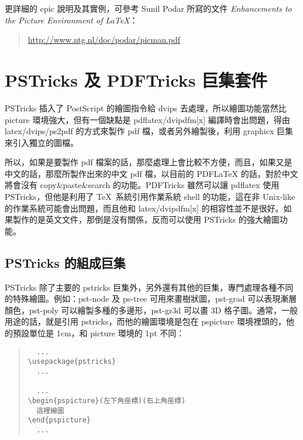 更詳細的 {\sffamily epic} 說明及其實例，可參考 Sunil Podar 所寫的文件 \textit{Enhancements to the Picture Environment of \LaTeX}：

\begin{quote}
  \url{http://www.ntg.nl/doc/podar/picman.pdf}
\end{quote}


\section{PSTricks 及 PDFTricks 巨集套件}
\label{sec:pstricks}

{\sffamily PSTricks} 插入了 {\sc PostScript} 的繪圖指令給 {\ttfamily dvips} 去處理，所以繪圖功能當然比 {\ttfamily picture} 環境強大，但有一個缺點是 {\ttfamily pdflatex/dvipdfm[x]} 編譯時會出問題，得由 {\ttfamily latex/dvips/ps2pdf} 的方式來製作 pdf 檔，或者另外繪製後，利用 {\sffamily graphicx} 巨集來引入獨立的圖檔。

所以，如果是要製作 pdf 檔案的話，那麼處理上會比較不方便，而且，如果又是中文的話，那麼所製作出來的中文 pdf 檔，以目前的 {\sffamily PDF\LaTeX} 的話，對於中文將會沒有 copy\&paste\&search 的功能。{\sffamily PDFTricks} 雖然可以讓 {\ttfamily pdflatex} 使用 {\sffamily PSTricks}，但他是利用了 \TeX\ 系統引用作業系統 shell 的功能，這在非 Unix-like 的作業系統可能會出問題，而且他和 {\ttfamily latex/dvipdfm[x]} 的相容性並不是很好。如果製作的是英文文件，那倒是沒有關係，反而可以使用 {\sffamily PSTricks} 的強大繪圖功能。

\subsection{PSTricks 的組成巨集}

{\sffamily PSTricks} 除了主要的 {\sffamily pstricks} 巨集外，另外還有其他的巨集，專門處理各種不同的特殊繪圖。例如：{\sffamily pst-node} 及 {\sffamily ps-tree} 可用來畫樹狀圖，{\sffamily pst-grad} 可以表現漸層顏色，{\sffamily pst-poly} 可以繪製多種的多邊形，{\sffamily pst-gr3d} 可以畫 3D 格子圖。通常，一般用途的話，就是引用 {\sffamily pstricks}，而他的繪圖環境是包在 {\ttfamily pspicture} 環境裡頭的，他的預設單位是 1cm，和 {\ttfamily picture} 環境的 1pt 不同：

\begin{quote}
  \begin{verbatim}
  ...
\usepackage{pstricks}
  ...

  ...
\begin{pspicture}(左下角座標)(右上角座標)
  這裡繪圖
\end{pspicture}
  ...
\end{verbatim}
\end{quote}

